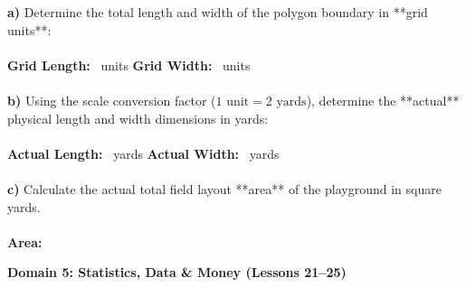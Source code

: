 \documentclass[12pt, letterpaper, fleqn]{article}
\newcommand{\blankshorter}{\underline{\hspace{2.0cm}}}
\newcommand{\blanklong}{\underline{\hspace{6.5cm}}}
\begin{document}
\begin{enumerate}[leftmargin=0.6cm, itemsep=1.2cm, start=13]
\textbf{a)} Determine the total length and width of the polygon boundary in **grid units**:
\\ \\
\textbf{Grid Length:} \blankshorter\ units \quad \textbf{Grid Width:} \blankshorter\ units \\ \\
\textbf{b)} Using the scale conversion factor ($1\text{ unit} = 2\text{ yards}$), determine the **actual** physical length and width dimensions in yards:
\\ \\
\textbf{Actual Length:} \blankshorter\ yards \quad \textbf{Actual Width:} \blankshorter\ yards \\ \\
\textbf{c)} Calculate the actual total field layout **area** of the playground in square yards.
\\ \\
\textbf{Area:} \blanklong

\end{enumerate}

\vspace{0.5cm}

\begin{tcolorbox}[colback=teal!5, colframe=teal!60!black, arc=2mm]
    \textbf{Domain 5: Statistics, Data \& Money (Lessons 21--25)}
\end{tcolorbox}
\end{document}
